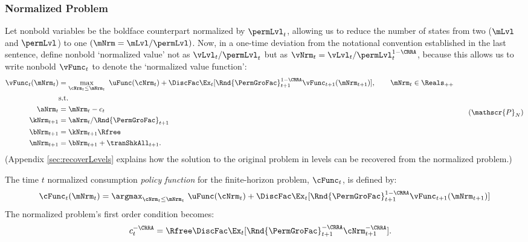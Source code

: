 \documentclass[BufferStockTheory]{subfiles}
\begin{document}
\hypertarget{The-Problem-Can-Be-Rewritten-in-Ratio-Form}{}
\hypertarget{The-Problem-Can-Be-Normalized-By-Permanent-Income}{}
\subsubsection{Normalized Problem}\label{subsubsec:ratio}

Let nonbold variables be the boldface counterpart normalized by $\permLvl_{t}$, allowing us to reduce the number of states from two ($\mLvl$ and $\permLvl$) to one $(\mNrm = \mLvl/\permLvl)$.
Now, in a one-time deviation from the notational convention established in the last sentence, define nonbold `normalized value' not as $\vLvl_{t}/\permLvl_{t}$ but as $\vNrm_{t} = \vLvl_{t}/\permLvl_{t}^{1-\CRRA}$, because this allows us to write nonbold $\vFunc_{t}$ to denote the `normalized value function':
%
%
\begin{equation}\label{eq:veqnNrmRecBellman}
  \begin{split}
    \vFunc_{t}(\mNrm_{t})  & = \max_{\cNrm_{t}\leq \mNrm_{t}}~  \uFunc(\cNrm_{t}) +\DiscFac \Ex_{t}[\Rnd{\PermGroFac}_{t+1}^{1-\CRRA}\vFunc_{t+1}({\mNrm}_{t+1})],\qquad  \mNrm_{t}\in \Reals_{++}\\
    & \mbox{s.t.}
    \\ {\aNrm}_{t}  & = \mNrm_{t}-c_{t}
    \\ {\kNrm}_{t+1} & = \aNrm_{t}/\Rnd{\PermGroFac}_{t+1} %
    \\ {\bNrm}_{t+1} & = \kNrm_{t+1} \Rfree %
    \\ \mNrm_{t+1}  & = \bNrm_{t+1} +\tranShkAll_{t+1} .
  \end{split}  \tag{$\mathscr{P}_{N}$}
\end{equation}
(Appendix \ref{sec:recoverLevels} explains how the solution to the original problem in levels can be recovered from the normalized problem.)

The time $t$ normalized consumption \textit{policy function} for the finite-horizon problem, $\cFunc_{t}$, is defined by:
%
%
\begin{equation}\label{eq: cfunceq1}
    \cFunc_{t}(\mNrm_{t})  = \argmax_{\cNrm_{t}\leq \mNrm_{t}}~  \uFunc(\cNrm_{t}) +\DiscFac \Ex_{t}[\Rnd{\PermGroFac}_{t+1}^{1-\CRRA}\vFunc_{t+1}(\mNrm_{t+1} )]  
\end{equation}
% 
The normalized problem's first order condition becomes:
\begin{align}
  c_{t}^{-\CRRA}  & = \Rfree \DiscFac \Ex_{t}[ \Rnd{\PermGroFac}_{t+1}^{-\CRRA} \cNrm_{t+1}^{-\CRRA}].  \label{eq:scaledeuler}
\end{align}
\end{document}

